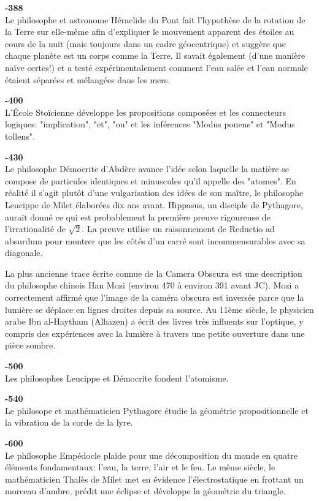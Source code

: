 \textbf{-388}\\
Le philosophe et astronome Héraclide du Pont fait l'hypothèse de la rotation de la Terre sur elle-même afin d'expliquer le mouvement apparent des étoiles au cours de la nuit (mais toujours dans un cadre géocentrique) et suggère que chaque planète est un corps comme la Terre. Il savait également (d'une manière naïve certes!) et a testé expérimentalement comment l'eau salée et l'eau normale étaient séparées et mélangées dans les mers.

\textbf{-400}\\
L'École Stoïcienne développe les propositions composées et les connecteurs logiques: "implication", "et", "ou" et les inférences "Modus ponens" et "Modus tollens".

\textbf{-430}\\
Le philosophe Démocrite d'Abdère avance l'idée selon laquelle la matière se compose de particules identiques et minuscules qu'il appelle des "atomes". En réalité il s'agit plutôt d'une vulgarisation des idées de son maître, le philosophe Leucippe de Milet élaborées dix ans avant. Hippasus, un disciple de Pythagore, aurait donné ce qui est probablement la première preuve rigoureuse de l'irrationalité de $\sqrt{2}$. La preuve utilise un raisonnement de Reductio ad absurdum pour montrer que les côtés d'un carré sont incommensurables avec sa diagonale.

La plus ancienne trace écrite connue de la Camera Obscura est une description du philosophe chinois Han Mozi (environ 470 à environ 391 avant JC). Mozi a correctement affirmé que l'image de la caméra obscura est inversée parce que la lumière se déplace en lignes droites depuis sa source. Au 11ème siècle, le physicien arabe Ibn al-Haytham (Alhazen) a écrit des livres très influents sur l'optique, y compris des expériences avec la lumière à travers une petite ouverture dans une pièce sombre.

\textbf{-500}\\
Les philosophes Leucippe et Démocrite fondent l'atomisme.

\textbf{-540}\\
Le philosope et mathématicien Pythagore étudie la géométrie propositionnelle et la vibration de la corde de la lyre.

\textbf{-600}\\
Le philosophe Empédocle plaide pour une décomposition du monde en quatre éléments fondamentaux: l'eau, la terre, l'air et le feu. Le même siècle, le mathématicien Thalès de Milet met en évidence l'électrostatique en frottant un morceau d'ambre, prédit une éclipse et développe la géométrie du triangle.

